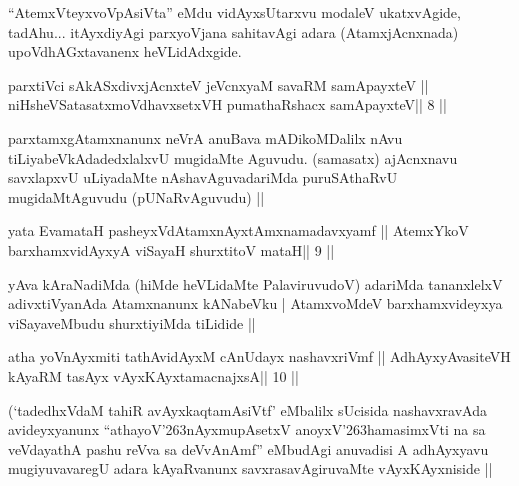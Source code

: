 \begin{artha}
``AtemxVteyxvoVpAsiVta'' eMdu vidAyxsUtarxvu modaleV ukatxvAgide, tadAhu... itAyxdiyAgi parxyoVjana sahitavAgi adara (AtamxjAcnxnada) upoVdhAGxtavanenx heVLidAdxgide.
\end{artha} 
 

\begin{shl}
parxtiVci sAkASxdivxjAcnxteV jeVcnxyaM savaRM samApayxteV ||
niHsheVSatasatxmoVdhavxsetxVH pumathaRshacx samApayxteV\hfill || 8 ||
\end{shl}

\begin{artha}
parxtamxgAtamxnanunx neVrA anuBava mADikoMDalilx nAvu tiLiyabeVkAdadedxlalxvU mugidaMte Aguvudu. (samasatx) ajAcnxnavu savxlapxvU uLiyadaMte nAshavAguvadariMda puruSAthaRvU mugidaMtAguvudu (pUNaRvAguvudu) ||
\end{artha}

\begin{shl}
yata EvamataH pasheyxVdAtamxnAyxtAmxnamadavxyamf ||
AtemxYkoV barxhamxvidAyxyA viSayaH shurxtitoV mataH\hfill || 9 ||
\end{shl}

\begin{artha}
yAva kAraNadiMda (hiMde heVLidaMte PalaviruvudoV) adariMda tananxlelxV adivxtiVyanAda Atamxnanunx kANabeVku | AtamxvoMdeV barxhamxvideyxya viSayaveMbudu shurxtiyiMda tiLidide || 
\end{artha} 
 
 

\begin{shl}
atha yoV\s nAyxmiti tathA\s vidAyxM cAnUdayx nashavxriVmf ||
A\s dhAyxyAvasiteVH kAyaRM tasAyx vAyxKAyxtamacnajxsA\hfill || 10 ||
\end{shl}

\begin{artha}
(`tadedhxVdaM tahiR avAyxkaqtamAsiVtf' eMbalilx sUcisida nashavxravAda 
avideyxyanunx ``athayoV\char'263nAyxmupAsetxV anoyxV\char'263hamasimxVti na sa veVdayathA pashu reVva sa deVvAnAmf'' eMbudAgi anuvadisi A adhAyx\-yavu mugiyuvavaregU adara kAyaRvanunx savxrasavAgiruvaMte vAyxKAyxniside ||
\end{artha} 
 
 
